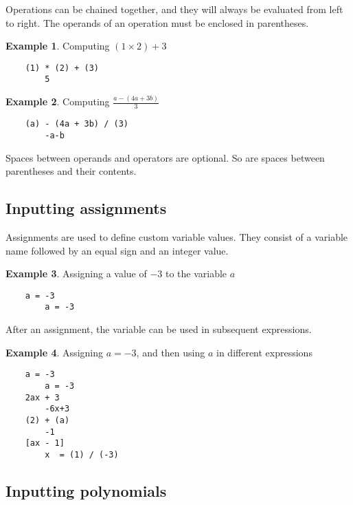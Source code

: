 Operations can be chained together, and they will always be evaluated from left to right. The operands of an operation must be enclosed in parentheses.

\theoremstyle{definition}
\newtheorem{exmp}{Example}[section]

\begin{exmp}{Computing $(1  \times 2) + 3$}
    \begin{verbatim}
    (1) * (2) + (3)
        5
    \end{verbatim}
\end{exmp}

\begin{exmp}{Computing $\frac{a - \left(4a + 3b\right)}{3}$}
    \begin{verbatim}
    (a) - (4a + 3b) / (3)   
        -a-b
    \end{verbatim}
\end{exmp}

Spaces between operands and operators are optional. So are spaces between parentheses and their contents.

\subsection{Inputting assignments}

Assignments are used to define custom variable values. They consist of a variable name followed by an equal sign and an integer value.

\begin{exmp}{Assigning a value of $-3$ to the variable $a$}
    \begin{verbatim}
    a = -3
        a = -3
    \end{verbatim}
\end{exmp}

After an assignment, the variable can be used in subsequent expressions.

\begin{exmp}
    {Assigning $a=-3$, and then using $a$ in different expressions}
    \begin{verbatim}
    a = -3
        a = -3
    2ax + 3
        -6x+3
    (2) + (a)
        -1
    [ax - 1]
        x  = (1) / (-3)
    \end{verbatim}
\end{exmp}

\subsection{Inputting polynomials}

